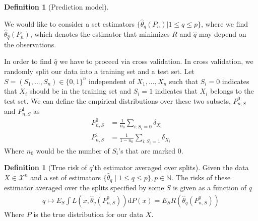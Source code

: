 \documentclass[11pt, a4paper]{article}
\theoremstyle{definition}
\newtheorem{definition}[theorem]{Definition}
\theoremstyle{remark}
\newtheorem{example}{Example}
\newcommand{\cl}{q}
\begin{document}
\begin{definition}[Prediction model]
\end{definition}

%

We would like to consider a set estimators $ \{ \hat{\theta}_{\cl}(P_n) | 1 \leq \cl \leq p \} $, where we find $ \hat{\theta}_{ \hat{\cl} }(P_n) $, which denotes the estimator that minimizes $ R $ and $ \hat{\cl}  $ may depend on the observations. 

In order to find $ \hat{\cl}  $ we have to proceed via cross validation. In cross validation, we randomly split our data into a training set and a test set. Let $ S = (S_1,...,S_n) \in \{0,1\}^{n} $ independent of $ X_1,..., X_n $ such that $ S_i = 0 $ indicates that $ X_i $ should be in the training set and $ S_i = 1 $ indicates that $ X_i $ belongs to the test set. We can define the empirical distributions over these two subsets, $ P_{n,S}^0$ and $ P_{n,S}^{1} $ as
\begin{align*}
    P_{n,S}^{0} &= \frac{1}{n_0} \sum_{i: S_i = 0} \delta_{X_i} \\
    P_{n,S}^{1} &= \frac{1}{1-n_0} \sum_{i: S_i = 1} \delta_{X_i} 
\end{align*}
Where $ n_0 $ would be the number of $ S_i $'s that are marked $ 0 $. 

\begin{definition}[True risk of $ \cl $'th estimator averaged over splits]
    Given the data $ X \in \mathcal{X}^{n} $ and a set of estimators $ \{ \hat{\theta}_{\cl} \mid 1 \leq \cl \leq p \}, p \in \mathbb{N} $. The risks of these estimator averaged over the splits specified by some $ S $ is given as a function of $ \cl $ 
    \begin{align*}
        \cl \mapsto E_S \int L(x, \hat{\theta}_{\cl}(P_{n,S}^{0}) ) \mathrm{d}P(x) = E_S R( \hat{\theta}_\cl(P_{n,S}^{0})) 
    \end{align*}
    Where $ P $ is the true distribution for our data $ X $.
\end{definition}
\end{document}
